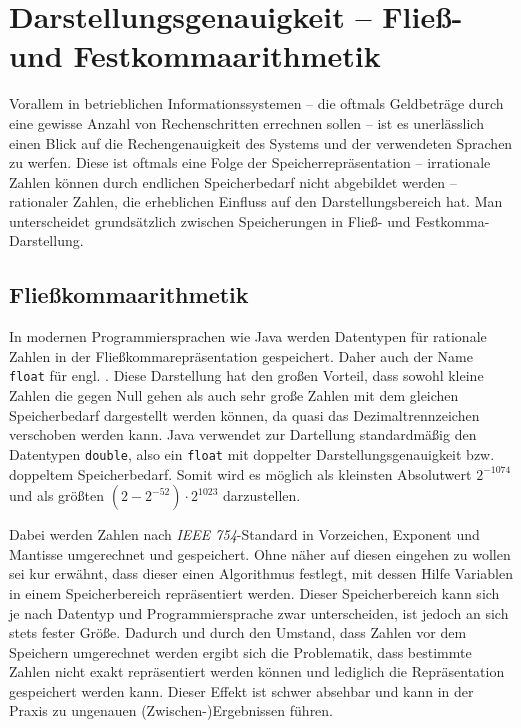 \section{Darstellungsgenauigkeit -- Fließ- und Festkommaarithmetik}
Vorallem in betrieblichen Informationssystemen -- die oftmals Geldbeträge durch eine gewisse Anzahl von Rechenschritten errechnen sollen -- ist es unerlässlich einen Blick auf die Rechengenauigkeit des Systems und der verwendeten Sprachen zu werfen. Diese ist oftmals eine Folge der Speicherrepräsentation -- irrationale Zahlen können durch endlichen Speicherbedarf nicht abgebildet werden -- rationaler Zahlen, die erheblichen Einfluss auf den Darstellungsbereich hat. Man unterscheidet grundsätzlich zwischen Speicherungen in Fließ- und Festkomma-Darstellung.
 
\subsection*{Fließkommaarithmetik}
In modernen Programmiersprachen wie Java werden Datentypen für rationale Zahlen in der Fließkommarepräsentation gespeichert. Daher auch der Name \texttt{float} für engl. . Diese Darstellung hat den großen Vorteil, dass sowohl kleine Zahlen die gegen Null gehen als auch sehr große Zahlen mit dem gleichen Speicherbedarf dargestellt werden können, da quasi das Dezimaltrennzeichen verschoben werden kann. Java verwendet zur Dartellung standardmäßig den Datentypen \texttt{double}, also ein \texttt{float} mit doppelter Darstellungsgenauigkeit bzw. doppeltem Speicherbedarf. Somit wird es möglich als kleinsten Absolutwert $2^{-1074}$ und als größten $(2 - 2^{-52}) \cdot 2^{1023}$ darzustellen.

Dabei werden Zahlen nach \textit{IEEE 754}-Standard in Vorzeichen, Exponent und Mantisse umgerechnet und gespeichert. Ohne näher auf diesen eingehen zu wollen sei kur erwähnt, dass dieser einen Algorithmus festlegt, mit dessen Hilfe Variablen in einem Speicherbereich repräsentiert werden. Dieser Speicherbereich kann sich je nach Datentyp und Programmiersprache zwar unterscheiden, ist jedoch an sich stets fester Größe. Dadurch und durch den Umstand, dass Zahlen vor dem Speichern umgerechnet werden ergibt sich die Problematik, dass bestimmte Zahlen nicht exakt repräsentiert werden können und lediglich die  Repräsentation gespeichert werden kann. Dieser Effekt ist schwer absehbar und kann in der Praxis zu ungenauen (Zwischen-)Ergebnissen führen.

